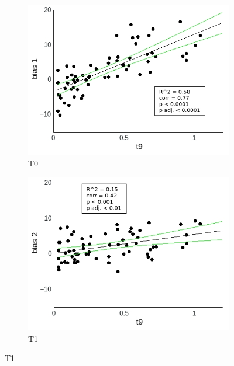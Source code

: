 \documentclass[a4paper]{scrreprt}
\begin{document}
\begin{figure}
\centering
\begin{subfigure}[b]{0.49\textwidth}
        \includegraphics[width=\textwidth]{figs/sec3/t9/t9no_diff_1_mod1mod1.jpeg}
        \caption{T0}
    \end{subfigure}
    \begin{subfigure}[b]{0.49\textwidth}
        \includegraphics[width=\textwidth]{figs/sec3/t9/t9no_diff_2_mod1mod1.jpeg}
        \caption{T1}
    \end{subfigure}


\end{figure}
\end{document}
